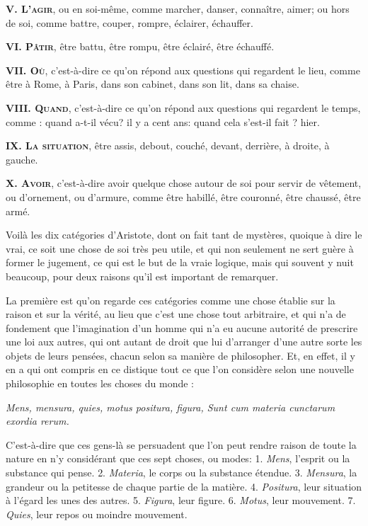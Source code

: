 \bigbreak
{\bfseries\scshape V. L'agir}, ou en soi-même, comme marcher, danser, connaître, aimer; ou hors de soi, comme battre, couper, rompre, éclairer, échauffer.

\bigbreak
{\bfseries\scshape VI. Pâtir}, être battu, être rompu, être éclairé, être échauffé.

\bigbreak
{\bfseries\scshape VII. Où}, c'est-à-dire ce qu'on répond aux questions qui regardent le lieu, comme être à Rome, à Paris, dans son cabinet, dans son lit, dans sa chaise.

\bigbreak
{\bfseries\scshape VIII. Quand}, c'est-à-dire ce qu'on répond aux questions qui regardent le temps, comme : quand a-t-il vécu? il y a cent ans: quand cela s'est-il fait ? hier.

\bigbreak
{\bfseries\scshape IX. La situation}, être assis, debout, couché, devant, derrière, à droite, à gauche.

\bigbreak
{\bfseries\scshape X. Avoir}, c'est-à-dire avoir quelque chose autour de soi pour servir de vêtement, ou d'ornement, ou d'armure, comme être habillé, être couronné, être chaussé, être armé.

\bigbreak
Voilà les dix catégories d'Aristote, dont on fait tant de mystères, quoique à dire le vrai, ce soit une chose de soi très peu utile, et qui non seulement ne sert guère à former le jugement, ce qui est le but de la vraie logique, mais qui souvent y nuit beaucoup, pour deux raisons qu'il est important de remarquer.

La première est qu'on regarde ces catégories comme une chose établie sur la raison et sur la vérité, au lieu que c'est une chose tout arbitraire, et qui n'a de fondement que l'imagination d'un homme qui n'a eu aucune autorité de prescrire une loi aux autres, qui ont autant de droit que lui d'arranger d'une autre sorte les objets de leurs pensées, chacun selon sa manière de philosopher. Et, en effet, il y en a qui ont compris en ce distique tout ce que l'on considère selon une nouvelle philosophie en toutes les choses du monde :

\begin{center}
\emph{Mens, mensura, quies, motus positura, figura, Sunt cum materia cunctarum exordia rerum.}
\end{center}

C'est-à-dire que ces gens-là se persuadent que l'on peut rendre raison de toute la nature en n'y considérant que ces sept choses, ou modes: {1. }\emph{Mens}, l'esprit ou la substance qui pense. {2. }\emph{Materia}, le corps ou la substance étendue. {3. }\emph{Mensura}, la grandeur ou la petitesse de chaque partie de la matière. {4. }\emph{Positura}, leur situation à l'égard les unes des autres. {5. }\emph{Figura}, leur figure. {6. }\emph{Motus}, leur mouvement. {7. }\emph{Quies}, leur repos ou moindre mouvement.

